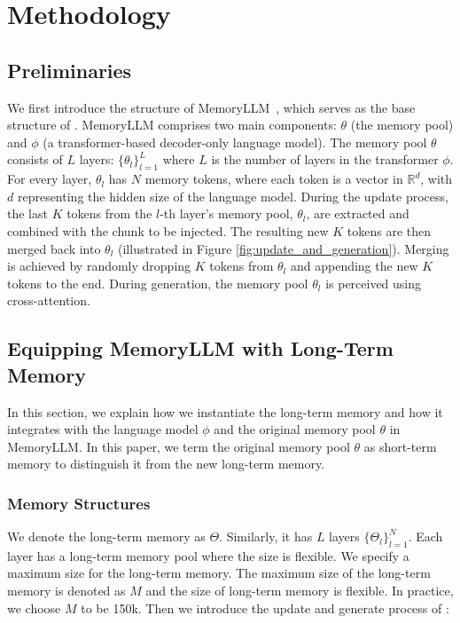 \vspace{-5pt}
\section{Methodology}
\subsection{Preliminaries}
\label{sub:preliminary}
We first introduce the structure of MemoryLLM~\citep{memoryllm}, which serves as the base structure of \ours. 
MemoryLLM comprises two main components: $\theta$ (the memory pool) and $\phi$ (a transformer-based decoder-only language model). The memory pool $\theta$ consists of $L$ layers: $\{\theta_l\}_{l=1}^{L}$ where $L$ is the number of layers in the transformer $\phi$. For every layer, $\theta_l$ has $N$ memory tokens, where each token is a vector in $\mathbb{R}^{d}$, with $d$ representing the hidden size of the language model. During the update process, the last $K$ tokens from the $l$-th layer’s memory pool, $\theta_l$, are extracted and combined with the chunk to be injected. The resulting new $K$ tokens are then merged back into $\theta_l$ (illustrated in Figure \ref{fig:update_and_generation}). Merging is achieved by randomly dropping $K$ tokens from $\theta_l$ and appending the new $K$ tokens to the end. 
During generation, the memory pool $\theta_l$ is perceived using cross-attention. 



\vspace{-5pt}
\subsection{Equipping MemoryLLM with Long-Term Memory}
In this section, we explain how we instantiate the long-term memory
and how it integrates with the language model $\phi$ and the original memory pool $\theta$ in MemoryLLM. In this paper, we term the original memory pool $\theta$ as short-term memory to distinguish it from the new long-term memory. 

\vspace{-5pt}
\subsubsection{Memory Structures}
We denote the long-term memory as $\Theta$. Similarly, it has $L$ layers $\{\Theta_l\}_{l=1}^N$. Each layer has a long-term memory pool where the size is flexible. We specify a maximum size for the long-term memory. The maximum size of the long-term memory is denoted as $M$ and 
the size of long-term memory is flexible. In practice, we choose $M$ to be 150k. Then we introduce the update and generate process of \ours:

